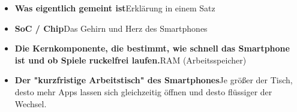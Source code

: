 
\begin{itemize}
  \item \textbf{Was eigentlich gemeint ist}Erklärung in einem Satz
  \item \textbf{SoC / Chip}Das Gehirn und Herz des Smartphones
  \item \textbf{Die Kernkomponente, die bestimmt, wie schnell das Smartphone ist und ob Spiele ruckelfrei laufen.}RAM (Arbeitsspeicher)
  \item \textbf{Der "kurzfristige Arbeitstisch" des Smartphones}Je größer der Tisch, desto mehr Apps lassen sich gleichzeitig öffnen und desto flüssiger der Wechsel.
\end{itemize}
